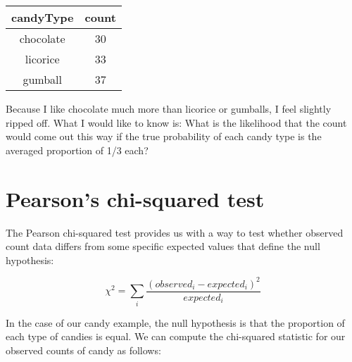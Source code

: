 \documentclass[]{book}
\theoremstyle{definition}
\theoremstyle{definition}
\theoremstyle{definition}
\theoremstyle{remark}
\begin{document}
\begin{longtable}[]{@{}cc@{}}
\toprule
\begin{minipage}[b]{0.16\columnwidth}\centering\strut
candyType\strut
\end{minipage} & \begin{minipage}[b]{0.09\columnwidth}\centering\strut
count\strut
\end{minipage}\tabularnewline
\midrule
\endhead
\begin{minipage}[t]{0.16\columnwidth}\centering\strut
chocolate\strut
\end{minipage} & \begin{minipage}[t]{0.09\columnwidth}\centering\strut
30\strut
\end{minipage}\tabularnewline
\begin{minipage}[t]{0.16\columnwidth}\centering\strut
licorice\strut
\end{minipage} & \begin{minipage}[t]{0.09\columnwidth}\centering\strut
33\strut
\end{minipage}\tabularnewline
\begin{minipage}[t]{0.16\columnwidth}\centering\strut
gumball\strut
\end{minipage} & \begin{minipage}[t]{0.09\columnwidth}\centering\strut
37\strut
\end{minipage}\tabularnewline
\bottomrule
\end{longtable}

Because I like chocolate much more than licorice or gumballs, I feel
slightly ripped off. What I would like to know is: What is the
likelihood that the count would come out this way if the true
probability of each candy type is the averaged proportion of 1/3 each?

\section{Pearson's chi-squared test}\label{pearsons-chi-squared-test}

The Pearson chi-squared test provides us with a way to test whether
observed count data differs from some specific expected values that
define the null hypothesis:

\[
\chi^2 = \sum_i\frac{(observed_i - expected_i)^2}{expected_i}
\]

In the case of our candy example, the null hypothesis is that the
proportion of each type of candies is equal. We can compute the
chi-squared statistic for our observed counts of candy as follows:
\end{document}
